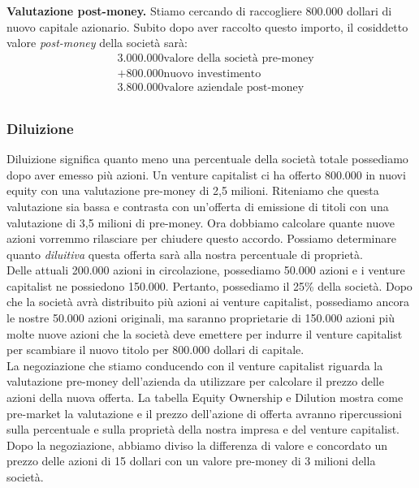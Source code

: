\documentclass[a4paper,portrait,12pt]{article}
\theoremstyle{definition}
\begin{document}
\textbf{Valutazione post-money.}
Stiamo cercando di raccogliere 800.000 dollari di nuovo capitale azionario.
Subito dopo aver raccolto questo importo, il cosiddetto valore \emph{post-money} della società sarà:
\begin{align*}
&3.000.000 \text{valore della società pre-money}\\
&+ 800.000 \text{nuovo investimento}\\
&3.800.000 \text{valore aziendale post-money}\\
\end{align*}


\subsubsection{Diluizione}
Diluizione significa quanto meno una percentuale della società totale possediamo dopo aver emesso più azioni.
Un venture capitalist ci ha offerto 800.000 in nuovi equity con una valutazione pre-money di 2,5 milioni.
Riteniamo che questa valutazione sia bassa e contrasta con un'offerta di emissione di titoli con una valutazione di 3,5 milioni di pre-money.
Ora dobbiamo calcolare quante nuove azioni vorremmo rilasciare per chiudere questo accordo.
Possiamo determinare quanto \emph{diluitiva} questa offerta sarà alla nostra percentuale di proprietà.\\

Delle attuali 200.000 azioni in circolazione, possediamo 50.000 azioni e i venture capitalist ne possiedono 150.000.
Pertanto, possediamo il 25\% della società.
Dopo che la società avrà distribuito più azioni ai venture capitalist, possediamo ancora le nostre 50.000 azioni originali, ma saranno proprietarie di 150.000 azioni più molte nuove azioni che la società deve emettere per indurre il venture capitalist per scambiare il nuovo titolo per 800.000 dollari di capitale.\\

La negoziazione che stiamo conducendo con il venture capitalist riguarda la valutazione pre-money dell'azienda da utilizzare per calcolare il prezzo delle azioni della nuova offerta.
La tabella Equity Ownership e Dilution mostra come pre-market la valutazione e il prezzo dell'azione di offerta avranno ripercussioni sulla percentuale e sulla proprietà della nostra impresa e del venture capitalist.
Dopo la negoziazione, abbiamo diviso la differenza di valore e concordato un prezzo delle azioni di 15 dollari con un valore pre-money di 3 milioni della società.\\
\end{document}

